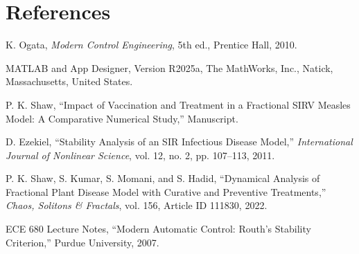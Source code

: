 \documentclass[11pt]{article}
\begin{document}
\section*{References}
\begin{thebibliography}{9}

K. Ogata, \textit{Modern Control Engineering}, 5th ed., Prentice Hall, 2010.

MATLAB and App Designer, Version R2025a, The MathWorks, Inc., Natick, Massachusetts, United States.

P. K. Shaw, “Impact of Vaccination and Treatment in a Fractional SIRV Measles Model: A Comparative Numerical Study,” Manuscript.

D. Ezekiel, “Stability Analysis of an SIR Infectious Disease Model,” \textit{International Journal of Nonlinear Science}, vol. 12, no. 2, pp. 107–113, 2011.

P. K. Shaw, S. Kumar, S. Momani, and S. Hadid, “Dynamical Analysis of Fractional Plant Disease Model with Curative and Preventive Treatments,” \textit{Chaos, Solitons \& Fractals}, vol. 156, Article ID 111830, 2022.

ECE 680 Lecture Notes, “Modern Automatic Control: Routh's Stability Criterion,” Purdue University, 2007.

\end{thebibliography}
\end{document}
